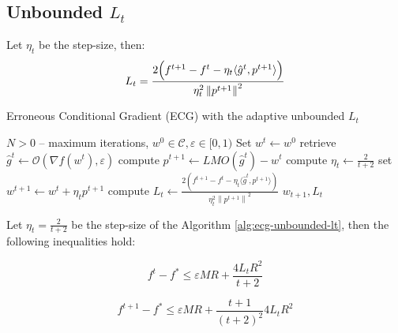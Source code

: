 \documentclass[runningheads, draft]{llncs}
\newcommand{\norm}[1]{\left\lVert#1\right\rVert}
\newcommand{\vprod}[1]{\langle#1\rangle}
\newcommand{\errgrad}{\hat{g}}
\begin{document}
\subsection{Unbounded $L_t$}
%
\begin{lemma}\label{lemma:aecg-unbounded-lt}Let $\eta_t$ be the step-size, then:
    \begin{equation}
        L_t = \frac{2\Bigl(f^{t+1} - f^t - \eta_t\vprod{\errgrad^t,p^{t+1}}\Bigr)}
        {\eta_t^2\norm{p^{t+1}}^2}
    \end{equation}
\end{lemma}
%
\begin{algorithm}[!ht]
    \caption{Erroneous Conditional Gradient (ECG) with the adaptive unbounded
        $L_t$}
    \begin{algorithmic}[1]
        \REQUIRE $N > 0$ -- maximum iterations, $w^0 \in \mathcal{C},
            \varepsilon \in [0, 1)$\;
        \STATE Set $w^t \leftarrow w^0$\;
        \STATE retrieve $\hat{g}^t \leftarrow \mathcal{O}(\nabla f(w^t), \varepsilon)$\;
        \STATE compute $p^{t+1} \leftarrow LMO(\hat{g}^t) - w^t$
        \STATE compute $\eta_t \leftarrow \frac{2}{t+2}$\;
        \STATE set $w^{t+1} \leftarrow w^t + \eta_t p^{t+1}$\;
        \STATE compute $L_t \leftarrow \frac{2(f^{t+1} - f^t - \eta_t\vprod{\errgrad^t,p^{t+1}})}
            {\eta_t^2\norm{p^{t+1}}^2}$\;
        \ENDFOR
        \RETURN $w_{t+1}, L_t$
    \end{algorithmic}\label{alg:ecg-unbounded-lt}
\end{algorithm}
%
\begin{theorem} Let $\eta_t = \frac{2}{t + 2}$ be the step-size of the
    Algorithm \ref{alg:ecg-unbounded-lt}, then the following inequalities hold:

    \begin{equation}\label{eq:aecg-convergencre-rate-theorem-unbounded-lt}
        f^t - f^* \leqslant \varepsilon M R + \frac{4 L_t R^2}{t+2}
    \end{equation}

    \begin{equation}
        f^{t+1} - f^* \leqslant \varepsilon M R + \frac{t + 1}{(t+2)^2}4 L_t R^2
    \end{equation}
\end{theorem}
%
\end{document}
